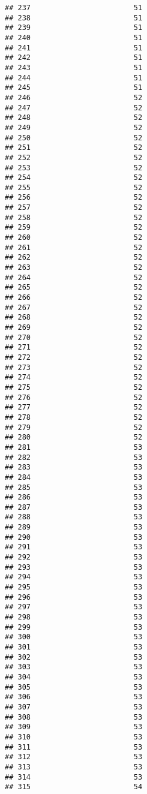 \documentclass[
]{article}
\begin{document}
\begin{verbatim}
## 237                        51
## 238                        51
## 239                        51
## 240                        51
## 241                        51
## 242                        51
## 243                        51
## 244                        51
## 245                        51
## 246                        52
## 247                        52
## 248                        52
## 249                        52
## 250                        52
## 251                        52
## 252                        52
## 253                        52
## 254                        52
## 255                        52
## 256                        52
## 257                        52
## 258                        52
## 259                        52
## 260                        52
## 261                        52
## 262                        52
## 263                        52
## 264                        52
## 265                        52
## 266                        52
## 267                        52
## 268                        52
## 269                        52
## 270                        52
## 271                        52
## 272                        52
## 273                        52
## 274                        52
## 275                        52
## 276                        52
## 277                        52
## 278                        52
## 279                        52
## 280                        52
## 281                        53
## 282                        53
## 283                        53
## 284                        53
## 285                        53
## 286                        53
## 287                        53
## 288                        53
## 289                        53
## 290                        53
## 291                        53
## 292                        53
## 293                        53
## 294                        53
## 295                        53
## 296                        53
## 297                        53
## 298                        53
## 299                        53
## 300                        53
## 301                        53
## 302                        53
## 303                        53
## 304                        53
## 305                        53
## 306                        53
## 307                        53
## 308                        53
## 309                        53
## 310                        53
## 311                        53
## 312                        53
## 313                        53
## 314                        53
## 315                        54

\end{verbatim}
\end{document}
